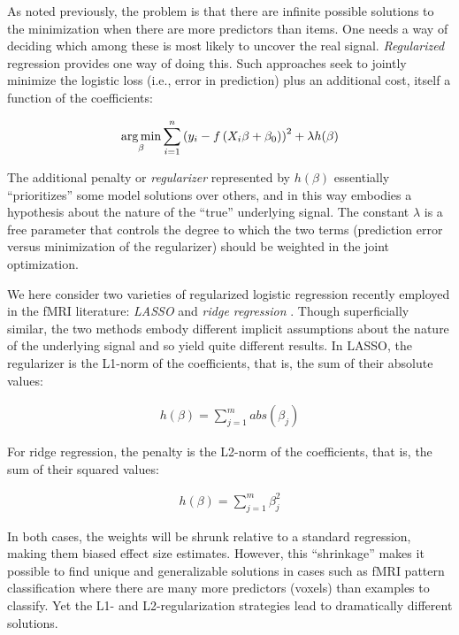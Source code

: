 As noted previously, the problem is that there are infinite possible solutions to the minimization when there are more predictors than items. One needs a way of deciding which among these is most likely to uncover the real signal. {\em Regularized} regression provides one way of doing this. Such approaches seek to jointly minimize the logistic loss (i.e., error in prediction) plus an additional cost, itself a function of the coefficients:

\begin{align}
\operatorname*{arg\,min}_\beta \sum^{n}_{i=1}{\left( y_i-f\left(  X_i\beta + \beta_0\right) \right) ^2} + \lambda h(\beta)
\label{eq.regularized}
\end{align}

The additional penalty or {\em regularizer} represented by $h(\beta)$ essentially ``prioritizes'' some model solutions over others, and in this way embodies a hypothesis about the nature of the ``true'' underlying signal. The constant $\lambda$ is a free parameter that controls the degree to which the two terms (prediction error versus minimization of the regularizer) should be weighted in the joint optimization.

We here consider two varieties of regularized logistic regression recently employed in the fMRI literature: {\em LASSO} and {\em ridge regression} \cite{riggall_relationship_2012,rish_sparse_2012}. Though superficially similar, the two methods embody different implicit assumptions about the nature of the underlying signal and so yield quite different results. In LASSO, the regularizer is the L1-norm of the coefficients, that is, the sum of their absolute values:

\begin{align}
h(\beta) = \sum^m_{j=1} abs(\beta_j)
\label{eq.lasso}
\end{align}

For ridge regression, the penalty is the L2-norm of the coefficients, that is, the sum of their squared values:

\begin{align}
h(\beta) = \sum^m_{j=1}\beta_j^2
\label{eq.ridge}
\end{align}

In both cases, the weights will be shrunk relative to a standard regression, making them biased effect size estimates. However, this ``shrinkage'' makes it possible to find unique and generalizable solutions in cases such as fMRI pattern classification where there are many more predictors (voxels) than examples to classify. Yet the L1- and L2-regularization strategies lead to dramatically different solutions.

